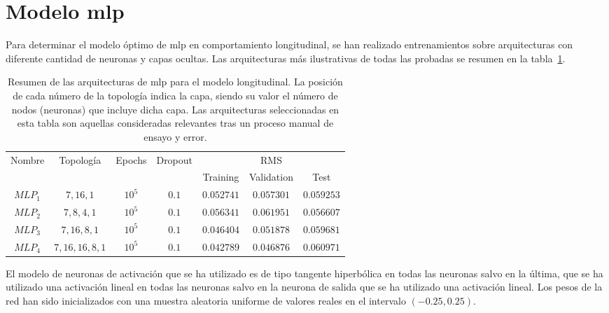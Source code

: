 \section{Modelo \ac{mlp}}

Para determinar el modelo óptimo de \ac{mlp} en comportamiento longitudinal, se han realizado entrenamientos sobre arquitecturas con diferente cantidad de neuronas y capas ocultas. Las arquitecturas más ilustrativas de todas las probadas se resumen en la tabla~\ref{tbl:cf-mlp-architectures}.

\begin{table}
	\caption[Resumen de las arquitecturas \ac{mlp} para el modelo longitudinal]{Resumen de las arquitecturas de \ac{mlp} para el modelo longitudinal. La posición de cada número de la topología indica la capa, siendo su valor el número de nodos (neuronas) que incluye dicha capa. Las arquitecturas seleccionadas en esta tabla son aquellas consideradas relevantes tras un proceso manual de ensayo y error.}
	\label{tbl:cf-mlp-architectures}
	\begin{tabular}{ccccccc}
		\hline
		\multirow{2}{*}{Nombre} & \multirow{2}{*}{Topología} & \multirow{2}{*}{Epochs} & \multirow{2}{*}{Dropout} & \multicolumn{3}{c}{RMS}      \\
		&                            &                         &                          & Training & Validation & Test \\ \hline
		$MLP_1$ & $7, 16, 1$                 & $10^5$                  & $0.1$                    & $0.052741$      & $0.057301$        & $0.059253$  \\
		$MLP_2$ & $7, 8, 4, 1$               & $10^5$                  & $0.1$                    & $0.056341$      & $0.061951$        & $0.056607$  \\
		$MLP_3$ & $7, 16, 8, 1$              & $10^5$                  & $0.1$                    & $0.046404$      & $0.051878$        & $0.059681$  \\
		$MLP_4$ & $7, 16, 16, 8, 1$          & $10^5$                  & $0.1$                    & $0.042789$      & $0.046876$        & $0.060971$  \\ \hline
	\end{tabular}
\end{table}

El modelo de neuronas de activación que se ha utilizado es de tipo tangente hiperbólica en todas las neuronas salvo en la última, que se ha utilizado una activación lineal en todas las neuronas salvo en la neurona de salida que se ha utilizado una activación lineal. Los pesos de la red han sido inicializados con una muestra aleatoria uniforme de valores reales en el intervalo $(-0.25, 0.25)$.

